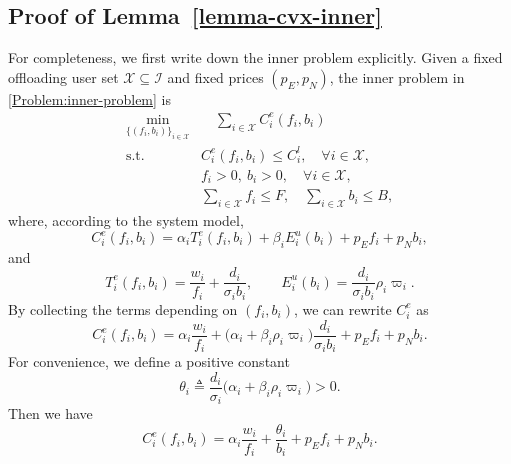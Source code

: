 \documentclass[lettersize,journal]{IEEEtran}
\begin{document}
\subsection{Proof of Lemma~\ref{lemma-cvx-inner}}\label{proof:lemma-cvx-inner}
For completeness, we first write down the inner problem explicitly.
Given a fixed offloading user set $\mathcal{X}\subseteq\mathcal{I}$ and fixed prices $(p_E,p_N)$, the inner problem in \eqref{Problem:inner-problem} is
\begin{subequations}\label{eq:inner}
    \begin{align}
      \min_{\{(f_i,b_i)\}_{i\in\mathcal{X}}} 
      &\quad \sum_{i\in\mathcal{X}} C_i^e(f_i,b_i) \label{eq:inner-obj}\\
      \text{s.t.}\ 
      & C_i^e(f_i,b_i) \le C_i^l,\quad \forall i\in\mathcal{X}, \label{eq:inner-local-ineq} \\
      & f_i > 0,\ b_i > 0,\quad \forall i\in\mathcal{X}, \label{eq:inner-nonneg}\\
      & \sum_{i\in\mathcal{X}} f_i \le F,\quad \sum_{i\in\mathcal{X}} b_i \le B, \label{eq:inner-capacity-ineq}
    \end{align}
\end{subequations}
where, according to the system model,
\begin{equation}
  C_i^e(f_i,b_i) 
  = \alpha_i T_i^e(f_i,b_i) + \beta_i E_i^u(b_i) + p_E f_i + p_N b_i,
\end{equation}
and
\begin{equation}
  T_i^e(f_i,b_i) 
  = \frac{w_i}{f_i} + \frac{d_i}{\sigma_i b_i},\qquad
  E_i^u(b_i)
  = \frac{d_i}{\sigma_i b_i}\rho_i\varpi_i.
\end{equation}
By collecting the terms depending on $(f_i,b_i)$, we can rewrite $C_i^e$ as
\begin{equation}
  C_i^e(f_i,b_i)
  = \alpha_i\frac{w_i}{f_i} 
    + \Big(\alpha_i + \beta_i\rho_i\varpi_i\Big)\frac{d_i}{\sigma_i b_i}
    + p_E f_i + p_N b_i.
\end{equation}
For convenience, we define a positive constant
\begin{equation}
  \theta_i \triangleq \frac{d_i}{\sigma_i}\big(\alpha_i + \beta_i\rho_i\varpi_i\big) > 0.
\end{equation}
Then we have
\begin{equation}
  C_i^e(f_i,b_i)
  = \alpha_i\frac{w_i}{f_i} + \frac{\theta_i}{b_i} + p_E f_i + p_N b_i.
  \label{eq:Ci-structure}
\end{equation}
\end{document}
